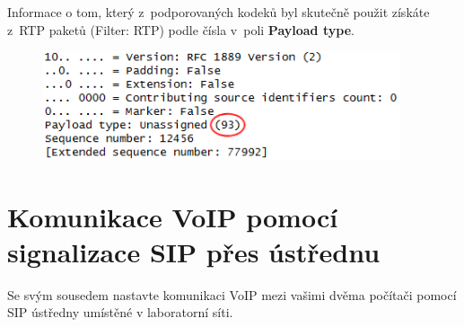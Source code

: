 \noindent Informace o tom, který z podporovaných kodeků byl skutečně použit získáte z RTP paketů (Filter: RTP) podle čísla v poli {\bf Payload type}.
\begin{figure}[h!]
  \centering
  \includegraphics[width=105mm]{img/3b.png}
\end{figure}


\section{Komunikace VoIP pomocí signalizace SIP přes ústřednu}
Se svým sousedem nastavte komunikaci VoIP mezi vašimi dvěma počítači pomocí SIP ústředny umístěné v laboratorní síti.

